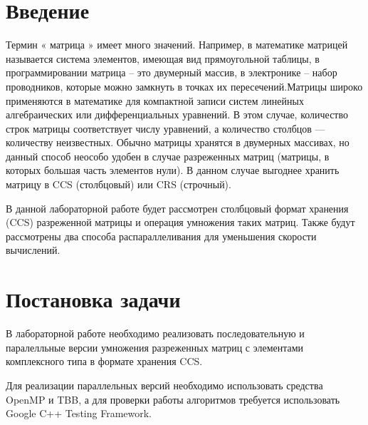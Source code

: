 \documentclass{report}
\begin{document}
\setcounter{page}{2}

\tableofcontents
\newpage

\section*{Введение}
Термин « матрица » имеет много значений. Например, в математике матрицей называется система элементов, имеющая вид прямоугольной таблицы, в программировании матрица – это двумерный массив, в электронике – набор проводников, которые можно замкнуть в точках их пересечений.Матрицы широко применяются в математике для компактной записи систем линейных алгебраических или дифференциальных уравнений. В этом случае, количество строк матрицы соответствует числу уравнений, а количество столбцов — количеству неизвестных. 
Обычно матрицы хранятся в двумерных массивах, но данный способ неособо удобен в случае разреженных матриц (матрицы, в которых большая часть элементов нули). В данном случае выгоднее хранить матрицу в CCS (столбцовый) или CRS (строчный).
\par В данной лабораторной работе будет рассмотрен столбцовый формат хранения (CCS) разреженной матрицы и операция умножения таких матриц. Также будут  рассмотрены два способа распараллеливания для уменьшения скорости вычислений.
\newpage

\section*{Постановка задачи}
В лабораторной работе необходимо реализовать последовательную и паралелльные версии умножения разреженных матриц с элементами комплексного типа в формате хранения CCS.
\par Для реализации параллельных версий необходимо использовать средства OpenMP и TBB, а для проверки работы алгоритмов требуется использовать Google C++ Testing Framework.
\newpage

\end{document}

